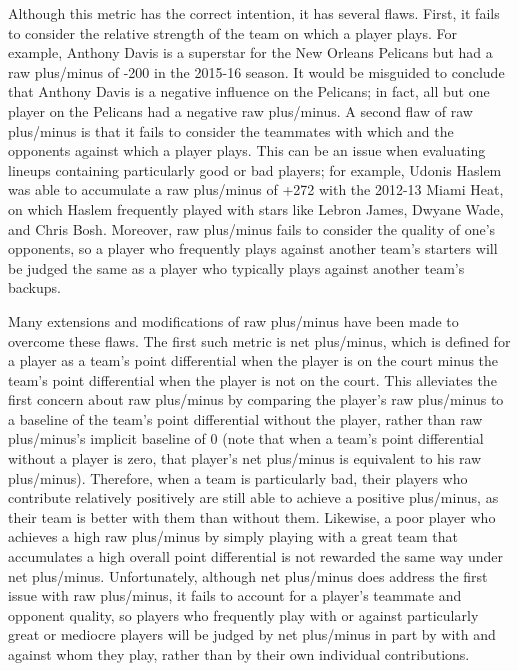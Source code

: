 Although this metric has the correct intention, it has several flaws. First, it
fails to consider the relative strength of the team on which a player plays. For
example, Anthony Davis is a superstar for the New Orleans Pelicans but had a raw
plus/minus of -200 in the 2015-16 season. It would be misguided to conclude that
Anthony Davis is a negative influence on the Pelicans; in fact, all but one
player on the Pelicans had a negative raw plus/minus. A second flaw of raw
plus/minus is that it fails to consider the teammates with which and the
opponents against which a player plays. This can be an issue when evaluating
lineups containing particularly good or bad players; for example, Udonis Haslem
was able to accumulate a raw plus/minus of +272 with the 2012-13 Miami Heat, on
which Haslem frequently played with stars like Lebron James, Dwyane Wade, and
Chris Bosh. Moreover, raw plus/minus fails to consider the quality of one's
opponents, so a player who frequently plays against another team's starters will
be judged the same as a player who typically plays against another team's
backups.

Many extensions and modifications of raw plus/minus have been made to overcome
these flaws. The first such metric is net plus/minus, which is defined for a
player as a team's point differential when the player is on the court minus the
team's point differential when the player is not on the court. This alleviates
the first concern about raw plus/minus by comparing the player's raw plus/minus
to a baseline of the team's point differential without the player, rather than
raw plus/minus's implicit baseline of 0 (note that when a team's point
differential without a player is zero, that player's net plus/minus is
equivalent to his raw plus/minus). Therefore, when a team is particularly bad,
their players who contribute relatively positively are still able to achieve a
positive plus/minus, as their team is better with them than without them.
Likewise, a poor player who achieves a high raw plus/minus by simply playing
with a great team that accumulates a high overall point differential is not
rewarded the same way under net plus/minus. Unfortunately, although net
plus/minus does address the first issue with raw plus/minus, it fails to account
for a player's teammate and opponent quality, so players who frequently play
with or against particularly great or mediocre players will be judged by net
plus/minus in part by with and against whom they play, rather than by their own
individual contributions.

